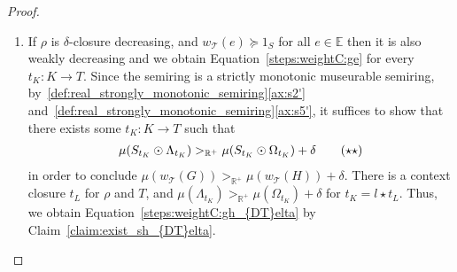 \begin{proof}
\begin{enumerate}
        \item
            If $\rho$ is $\delta$-closure decreasing, and $w_\mathcal{T}(e) \succeq 1_S$ for all $e \in \mathbb{E}$ then it is also weakly decreasing and we obtain Equation~\eqref{steps:weightC:ge} for every $t_K : K \to T$.
            Since the semiring is a strictly monotonic museurable semiring,  by~\autoref{def:real_strongly_monotonic_semiring}\eqref{ax:s2'} and~\autoref{def:real_strongly_monotonic_semiring}\eqref{ax:s5'}, it suffices to show that there exists some $t_K : K \to T$ such that 
            \begin{align}
                \mu(S_{t_K} \odot \Lambda_{t_K}) >_{\mathbb{R}^+} \mu(S_{t_K} \odot \Omega_{t_K}) + 
                \delta
              \tag{$\star\star$}\label{steps:weightC:gh_{DT}elta}
            \end{align}
            in order to conclude $ \mu(w_\mathcal{T}(G)) >_{\mathbb{R}^+} \mu(w_\mathcal{T}(H)) + \delta$.
            There is a context closure $t_L$ for $\rho$ and $T$, and
            $\mu(\Lambda_{t_K}) >_{\mathbb{R}^+} \mu(\Omega_{t_K}) + \delta$
            for $t_K = l \star t_L$. Thus, we obtain Equation~\eqref{steps:weightC:gh_{DT}elta} by Claim~\ref{claim:exist_sh_{DT}elta}.
    \end{enumerate}
\end{proof}  